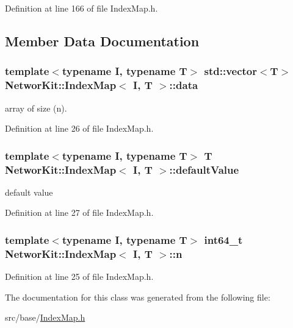 Definition at line 166 of file Index\-Map.\-h.



\subsection{Member Data Documentation}
\hypertarget{class_networ_kit_1_1_index_map_ade29c9c1886b524dc11d0032b6063d83}{
\subsubsection[{data}]{\setlength{\rightskip}{0pt plus 5cm}template$<$typename I, typename T$>$ std\-::vector$<$T$>$ {\bf Networ\-Kit\-::\-Index\-Map}$<$ I, T $>$\-::data\hspace{0.3cm}{\ttfamily [protected]}}}\label{class_networ_kit_1_1_index_map_ade29c9c1886b524dc11d0032b6063d83}


array of size (n). 



Definition at line 26 of file Index\-Map.\-h.

\hypertarget{class_networ_kit_1_1_index_map_aa7b9e890a78e37f9e1fd1978b3706c4c}{
\subsubsection[{default\-Value}]{\setlength{\rightskip}{0pt plus 5cm}template$<$typename I, typename T$>$ T {\bf Networ\-Kit\-::\-Index\-Map}$<$ I, T $>$\-::default\-Value\hspace{0.3cm}{\ttfamily [protected]}}}\label{class_networ_kit_1_1_index_map_aa7b9e890a78e37f9e1fd1978b3706c4c}


default value 



Definition at line 27 of file Index\-Map.\-h.

\hypertarget{class_networ_kit_1_1_index_map_aabb9796ff1a0c002446b14ff7d4fffbc}{
\subsubsection[{n}]{\setlength{\rightskip}{0pt plus 5cm}template$<$typename I, typename T$>$ int64\-\_\-t {\bf Networ\-Kit\-::\-Index\-Map}$<$ I, T $>$\-::n\hspace{0.3cm}{\ttfamily [protected]}}}\label{class_networ_kit_1_1_index_map_aabb9796ff1a0c002446b14ff7d4fffbc}


Definition at line 25 of file Index\-Map.\-h.



The documentation for this class was generated from the following file\-:\begin{DoxyCompactItemize}
\item 
src/base/\hyperlink{_index_map_8h}{Index\-Map.\-h}\end{DoxyCompactItemize}
